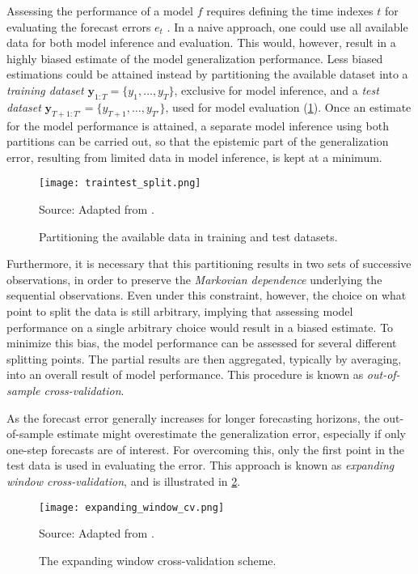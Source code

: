 Assessing the performance of a model $f$ requires defining the time indexes $t$ for evaluating the forecast errors $e_{t}$ . In a naive approach, one could use all available data for both model inference and evaluation. This would, however, result in a highly biased estimate of the model generalization performance. Less biased estimations could be attained instead by partitioning the available dataset into a \textit{training dataset} $\boldsymbol{y} _{1:T} = \{y_1,…,y_T\}$, exclusive for model inference, and a \textit{test dataset} $\boldsymbol{y} _{T+1:T'} = \{y_{T+1},…,y_{T'}\}$, used for model evaluation (\ref{fig:training_test_split}). Once an estimate for the model performance is attained, a separate model inference using both partitions can be carried out, so that the epistemic part of the generalization error, resulting from limited data in model inference, is kept at a minimum.
\begin{figure}[H]%
	\centering
    \caption{Partitioning the available data in training and test datasets.}
    \texttt{[image: traintest\_split.png]} \\
    \raggedright
    Source: Adapted from \cite{krispin2019handson}.
	\label{fig:training_test_split}
\end{figure}

Furthermore, it is necessary that this partitioning results in two sets of successive observations, in order to preserve the \textit{Markovian dependence} underlying the sequential observations. Even under this constraint, however, the choice on what point to split the data is still arbitrary, implying that assessing model performance on a single arbitrary choice would result in a biased estimate. To minimize this bias, the model performance can be assessed for several different splitting points. The partial results are then aggregated, typically by averaging, into an overall result of model performance. This procedure is known as \textit{out-of-sample cross-validation}.

As the forecast error generally increases for longer forecasting horizons, the out-of-sample estimate might overestimate the generalization error, especially if only one-step forecasts are of interest. For overcoming this, only the  first point in the test data is used in evaluating the error. This approach is known as \textit{expanding window cross-validation}, and is illustrated in \ref{fig:expanding_window_cv}.
\begin{figure}[H]%
	\centering
    \caption{The expanding window cross-validation scheme.}
    \texttt{[image: expanding\_window\_cv.png]} \\
    \raggedright
    Source: Adapted from \cite{krispin2019handson}.
	\label{fig:expanding_window_cv}
\end{figure}


